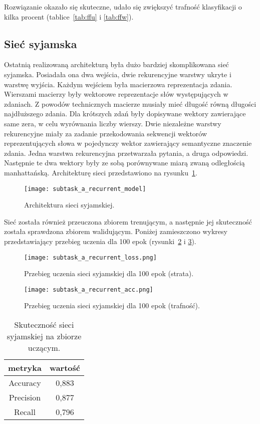 Rozwiązanie okazało się skuteczne, udało się zwiększyć trafność klasyfikacji o kilka procent (tablice~\ref{tab:ffu} i \ref{tab:ffw}). 


\subsection{Sieć syjamska}

Ostatnią realizowaną architekturą była dużo bardziej skomplikowana sieć syjamska. Posiadała ona dwa wejścia, dwie rekurencyjne warstwy ukryte i warstwę wyjścia. Każdym wejściem była macierzowa reprezentacja zdania. Wierszami macierzy były wektorowe reprezentacje słów występujących w zdaniach. Z powodów technicznych macierze musiały mieć długość równą długości najdłuższego zdania. Dla krótszych zdań były dopisywane wektory zawierające same zera, w celu wyrównania liczby wierszy. Dwie niezależne warstwy rekurencyjne miały za zadanie przekodowania sekwencji wektorów reprezentujących słowa w pojedynczy wektor zawierający semantyczne znaczenie zdania. Jedna warstwa rekurencyjna przetwarzała pytania, a druga odpowiedzi. Następnie te dwa wektory były ze sobą porównywane miarą zwaną odległością manhattańską. Architekturę sieci przedstawiono na rysunku~\ref{fig:acrchrr}.   

\begin{figure}[H]
\caption{Architektura sieci syjamskiej. \label{fig:acrchrr}}
\texttt{[image: subtask\_a\_recurrent\_model]}
\centering
\end{figure}

Sieć została również przeuczona zbiorem trenującym, a następnie jej skuteczność została sprawdzona zbiorem walidującym. Poniżej zamieszczono wykresy przedstawiający przebieg uczenia dla 100 epok (rysunki~\ref{fig:fflossrr} i \ref{fig:ffaccrr}).

\begin{figure}[H]
\centering
\caption{Przebieg uczenia sieci syjamskiej dla 100 epok (strata). \label{fig:fflossrr}}
\texttt{[image: subtask\_a\_recurrent\_loss.png]}
\end{figure}


\begin{figure}[H]
\centering
\caption{Przebieg uczenia  sieci syjamskiej  dla 100 epok (trafność). \label{fig:ffaccrr}}
\texttt{[image: subtask\_a\_recurrent\_acc.png]}
\end{figure}


\begin{table}[H]
\caption{Skuteczność sieci syjamskiej na zbiorze uczącym.}
\label{train_set_statistics_score_table}
    \begin{center}
        \begin{tabular}{ |c|c| } 
            \hline
            metryka & wartość\\
            \hline
            Accuracy & 0,883 \\
            \hline
            Precision & 0,877 \\
            \hline
            Recall & 0,796\\ 
            \hline
        \end{tabular}
    \end{center}
\end{table}

